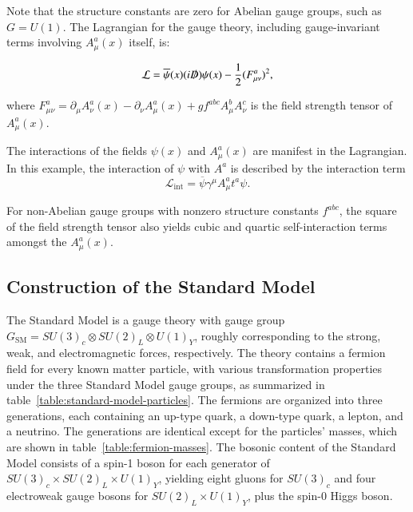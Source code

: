 Note that the structure constants are zero for Abelian gauge groups, such as $G=U(1)$. The Lagrangian for the gauge theory, including gauge-invariant terms involving $A^a_{\mu}(x)$ itself, is:

\begin{equation}
	\mathcal{L} = \overline{\psi}(x) (i\slashed{D}) \psi(x) - \frac{1}{2} (F^a_{\mu\nu})^2,
\end{equation}

where $F_{\mu\nu}^a=\partial_{\mu}A^a_{\nu}(x) - \partial_{\nu} A^a_{\mu}(x) + g f^{abc}A_{\mu}^b A_{\nu}^c$ is the field strength tensor of $A^a_{\mu}(x)$. 

The interactions of the fields $\psi(x)$ and $A^a_{\mu}(x)$ are manifest in the Lagrangian. In this example, the interaction of $\psi$ with $A^a$ is described by the interaction term
\begin{equation}
	\mathcal{L}_{\mathrm{int}} = \overline{\psi} \gamma^{\mu}A^a_{\mu}t^a \psi.
\end{equation}

For non-Abelian gauge groups with nonzero structure constants $f^{abc}$, the square of the field strength tensor also yields cubic and quartic self-interaction terms amongst the $A^a_{\mu}(x)$.



\subsection{Construction of the Standard Model}
The Standard Model is a gauge theory with gauge group $G_{\mathrm{SM}}=SU(3)_c\otimes SU(2)_L \otimes U(1)_Y$, roughly corresponding to the strong, weak, and electromagnetic forces, respectively. The theory contains a fermion field for every known matter particle, with various transformation properties under the three Standard Model gauge groups, as summarized in table~\ref{table:standard-model-particles}. The fermions are organized into three generations, each containing an up-type quark, a down-type quark, a lepton, and a neutrino. The generations are identical except for the particles' masses, which are shown in table~\ref{table:fermion-masses}. The bosonic content of the Standard Model consists of a spin-1 boson for each generator of $SU(3)_c\times SU(2)_L \times U(1)_Y$, yielding eight gluons for $SU(3)_c$ and four electroweak gauge bosons for $SU(2)_L\times U(1)_Y$, plus the spin-0 Higgs boson. 


